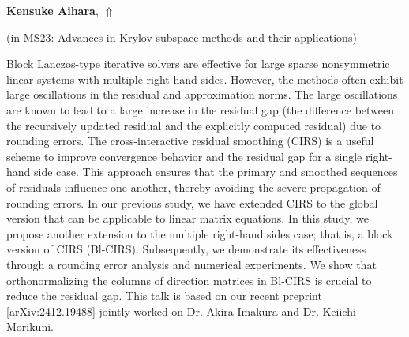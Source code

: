 \documentclass[ILAS2025-program.tex]{subfiles}
\begin{document}
\hypertarget{down0391}{}\begin{ilasabstract}
    
\textbf{Kensuke Aihara},  \hfill \hyperlink{up0391}{$\Uparrow$}
    
    
(in {\color{mstitle}MS23: Advances in Krylov subspace methods and their applications})
        
\mtskip
    Block Lanczos-type iterative solvers are effective for large sparse nonsymmetric linear systems with multiple right-hand sides. However, the methods often exhibit large oscillations in the residual and approximation norms. The large oscillations are known to lead to a large increase in the residual gap (the difference between the recursively updated residual and the explicitly computed residual) due to rounding errors. The cross-interactive residual smoothing (CIRS) is a useful scheme to improve convergence behavior and the residual gap for a single right-hand side case. This approach ensures that the primary and smoothed sequences of residuals influence one another, thereby avoiding the severe propagation of rounding errors. In our previous study, we have extended CIRS to the global version that can be applicable to linear matrix equations. In this study, we propose another extension to the multiple right-hand sides case; that is, a block version of CIRS (Bl-CIRS). Subsequently, we demonstrate its effectiveness through a rounding error analysis and numerical experiments. We show that orthonormalizing the columns of direction matrices in Bl-CIRS is crucial to reduce the residual gap. This talk is based on our recent preprint [arXiv:2412.19488] jointly worked on Dr. Akira Imakura and Dr. Keiichi Morikuni. 

\end{ilasabstract}
    
\end{document}

